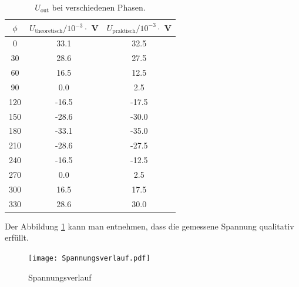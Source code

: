 \begin{table}
  \centering
  \begin{tabular}{c c c}
    \toprule
    $\phi$ & $U_{\text{theoretisch}} / 10^{-3} \cdot $ V & $U_{\text{praktisch}} / 10^{-3} \cdot $ V \\
    \midrule
    0	  &  33.1  &  32.5	\\
    30	&  28.6  &  27.5	\\
    60	&  16.5  &  12.5	\\
    90	&  0.0 	 &   2.5	\\
    120	& -16.5  & -17.5	\\
    150	& -28.6  & -30.0	\\
    180	& -33.1  & -35.0	\\
    210	& -28.6  & -27.5	\\
    240	& -16.5  & -12.5	\\
    270	&  0.0 	 &  2.5	 	\\
    300	&  16.5  &  17.5	\\
    330	&  28.6	 &  30.0	\\
  \end{tabular}
  \caption{$U_{\text{out}}$ bei verschiedenen Phasen.}
  \label{tab:Uphase}
\end{table}
Der Abbildung \ref{fig:Spannungsverlauf} kann man entnehmen, dass die gemessene Spannung qualitativ erfüllt. %
\begin{figure}
  \centering
  \texttt{[image: Spannungsverlauf.pdf]}
  \caption{Spannungsverlauf}
  \label{fig:Spannungsverlauf}
\end{figure}
